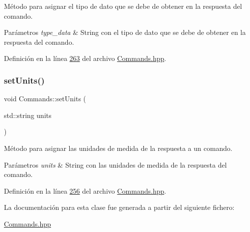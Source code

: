 Método para asignar el tipo de dato que se debe de obtener en la respuesta del comando. 


\begin{DoxyParams}{Parámetros}
{\em type\+\_\+data} & String con el tipo de dato que se debe de obtener en la respuesta del comando. \\
\hline
\end{DoxyParams}


Definición en la línea \hyperlink{Commands_8hpp_source_l00263}{263} del archivo \hyperlink{Commands_8hpp_source}{Commands.\+hpp}.

\mbox{\label{classCommands_a35d92f904b7e1d2e806f7f7d92b23952}} 
\subsubsection{\texorpdfstring{set\+Units()}{setUnits()}}
{\footnotesize\ttfamily void Commands\+::set\+Units (\begin{DoxyParamCaption}\item[{std\+::string}]{units }\end{DoxyParamCaption})\hspace{0.3cm}{\ttfamily [inline]}}



Método para asignar las unidades de medida de la respuesta a un comando. 


\begin{DoxyParams}{Parámetros}
{\em units} & String con las unidades de medida de la respuesta del comando. \\
\hline
\end{DoxyParams}


Definición en la línea \hyperlink{Commands_8hpp_source_l00256}{256} del archivo \hyperlink{Commands_8hpp_source}{Commands.\+hpp}.



La documentación para esta clase fue generada a partir del siguiente fichero\+:\begin{DoxyCompactItemize}
\item 
\hyperlink{Commands_8hpp}{Commands.\+hpp}\end{DoxyCompactItemize}
